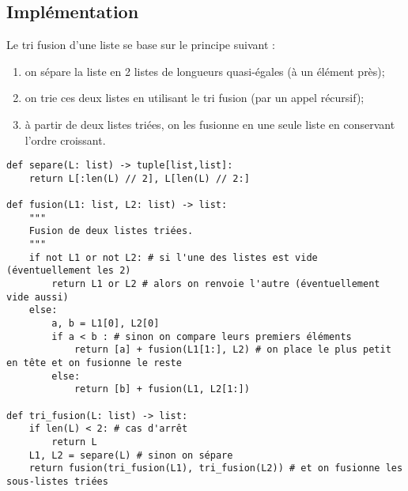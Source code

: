 \subsection{Implémentation}

Le tri fusion d'une liste se base sur le principe suivant : 
\begin{enumerate}
\item on sépare la liste en 2 listes de longueurs quasi-égales (à un élément près);
\item on trie ces deux listes en utilisant le tri fusion (par un appel récursif);
\item à partir de deux listes triées, on les fusionne en une seule liste en conservant l'ordre croissant.
\end{enumerate}


\begin{lstlisting}
def separe(L: list) -> tuple[list,list]:
    return L[:len(L) // 2], L[len(L) // 2:]

def fusion(L1: list, L2: list) -> list:
    """
    Fusion de deux listes triées. 
    """
    if not L1 or not L2: # si l'une des listes est vide (éventuellement les 2)
        return L1 or L2 # alors on renvoie l'autre (éventuellement vide aussi)
    else:
        a, b = L1[0], L2[0] 
        if a < b : # sinon on compare leurs premiers éléments
            return [a] + fusion(L1[1:], L2) # on place le plus petit en tête et on fusionne le reste
        else:
            return [b] + fusion(L1, L2[1:])
        
def tri_fusion(L: list) -> list:
    if len(L) < 2: # cas d'arrêt
        return L
    L1, L2 = separe(L) # sinon on sépare
    return fusion(tri_fusion(L1), tri_fusion(L2)) # et on fusionne les sous-listes triées
\end{lstlisting}
%		
%
%
%
%
%		
%
%
%
